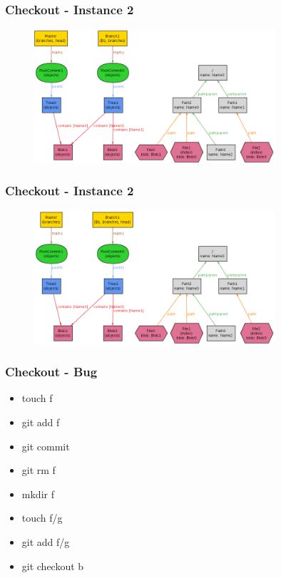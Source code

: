 \documentclass{beamer}
\begin{document}
\begin{frame}[fragile]
   \frametitle{Checkout - Instance 2}
      \begin{figure}
         \centering
         \includegraphics[width=0.80\textwidth]{images/checkout2_1.png}
      \end{figure}
\end{frame}

\begin{frame}[fragile]
   \frametitle{Checkout - Instance 2}
      \begin{figure}
         \centering
         \includegraphics[width=0.80\textwidth]{images/checkout2_2.png}
      \end{figure}
\end{frame}

\begin{frame}
	\frametitle{Checkout - Bug}
	\begin{itemize}
	   \item touch f \pause
	   \item git add f \pause
	   \item git commit \pause
	   \item git rm f \pause
	   \item mkdir f \pause
	   \item touch f/g \pause
	   \item git add f/g \pause 
	   \item git checkout b 
	\end{itemize}
\end{frame}
\end{document}
